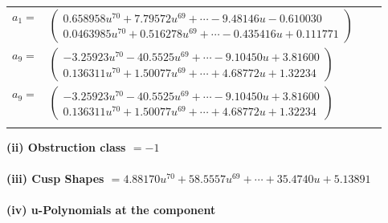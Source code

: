 \documentclass[1p]{elsarticle_modified}
\theoremstyle{definition}
\begin{document}
\begin{tabular}{m{7pt} m{180pt} m{7pt} m{180pt} }
\flushright $a_{1}=$&$\begin{pmatrix}0.658958 u^{70}+7.79572 u^{69}+\cdots-9.48146 u-0.610030\\0.0463985 u^{70}+0.516278 u^{69}+\cdots-0.435416 u+0.111771\end{pmatrix}$ \\
\flushright $a_{9}=$&$\begin{pmatrix}-3.25923 u^{70}-40.5525 u^{69}+\cdots-9.10450 u+3.81600\\0.136311 u^{70}+1.50077 u^{69}+\cdots+4.68772 u+1.32234\end{pmatrix}$\\ \flushright $a_{9}=$&$\begin{pmatrix}-3.25923 u^{70}-40.5525 u^{69}+\cdots-9.10450 u+3.81600\\0.136311 u^{70}+1.50077 u^{69}+\cdots+4.68772 u+1.32234\end{pmatrix}$\\&\end{tabular}
\flushleft \textbf{(ii) Obstruction class $= -1$}\\~\\
\flushleft \textbf{(iii) Cusp Shapes $= 4.88170 u^{70}+58.5557 u^{69}+\cdots+35.4740 u+5.13891$}\\~\\
\newpage\renewcommand{\arraystretch}{1}
\flushleft \textbf{(iv) u-Polynomials at the component}\newline \\
\end{document}
